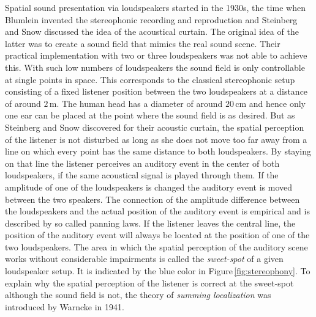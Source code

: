 Spatial sound presentation via loudspeakers started in the 1930s, the time when
Blumlein invented the stereophonic recording and
reproduction and Steinberg and Snow discussed the idea of
the acoustical curtain.\autocite{Steinberg1934}
The original idea of the latter was to create a sound field that mimics the real sound
scene. Their practical implementation with two or three loudspeakers was not able
to achieve this. With such low numbers of loudspeakers the sound field is only
controllable at single points in space. This corresponds to the classical
stereophonic setup consisting of a fixed listener position between the two
loudspeakers at a distance of around $2$\,m.
The human head has a diameter of around $20$\,cm and hence only one ear can
be placed at the point where the sound field is as desired. But as Steinberg and
Snow discovered for their acoustic curtain, the spatial perception of the
listener is not disturbed as long as she does not move too far away from a line
on which every point has the same distance to both loudspeakers.
By staying on that line the listener perceives an
auditory event in the center of both loudspeakers, if the same acoustical signal
is played through them. If the amplitude of one of the loudspeakers is changed
the auditory event is moved between the two speakers. The connection of the
amplitude difference between the loudspeakers and the actual position of the
auditory event is empirical and is described by so called panning
laws.
If the listener leaves the central line, the position of the auditory event
will always be located at the position of one of the two loudspeakers. The area in which the
spatial perception of the auditory scene works without considerable impairments
is called the \emph{sweet-spot} of a given loudspeaker setup. It is indicated
by the blue color in Figure\,\ref{fig:stereophony}.
To explain why the spatial perception of the listener is correct at the
sweet-spot although the sound field is not, the theory of \emph{summing
localization} was introduced by Warncke in 1941.

